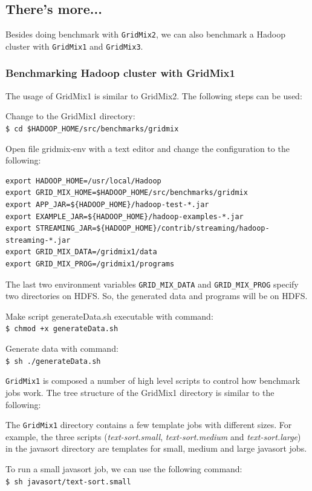 \subsection*{There's more...}
Besides doing benchmark with \verb|GridMix2|, we can also benchmark a Hadoop cluster with \verb|GridMix1| and \verb|GridMix3|.

\subsubsection*{Benchmarking Hadoop cluster with GridMix1}
The usage of GridMix1 is similar to GridMix2. The following steps can be used:

Change to the GridMix1 directory: \\
\verb|$ cd $HADOOP_HOME/src/benchmarks/gridmix|

Open file gridmix-env with a text editor and change the configuration to the following:
\lstset{style=bashstyle}
\begin{lstlisting}
export HADOOP_HOME=/usr/local/Hadoop
export GRID_MIX_HOME=$HADOOP_HOME/src/benchmarks/gridmix
export APP_JAR=${HADOOP_HOME}/hadoop-test-*.jar
export EXAMPLE_JAR=${HADOOP_HOME}/hadoop-examples-*.jar
export STREAMING_JAR=${HADOOP_HOME}/contrib/streaming/hadoop-streaming-*.jar
export GRID_MIX_DATA=/gridmix1/data
export GRID_MIX_PROG=/gridmix1/programs
\end{lstlisting}

The last two environment variables \verb|GRID_MIX_DATA| and \verb|GRID_MIX_PROG| specify two directories on HDFS. So, the generated data and programs will be on HDFS.

Make script generateData.sh executable with command: \\
\verb|$ chmod +x generateData.sh|

Generate data with command: \\
\verb|$ sh ./generateData.sh|

\verb|GridMix1| is composed a number of high level scripts to control how benchmark jobs work. The tree structure of the GridMix1 directory is similar to the following:

The \verb|GridMix1| directory contains a few template jobs with different sizes. For example, the three scripts (\emph{text-sort.small}, \emph{text-sort.medium} and \emph{text-sort.large}) in the javasort directory are templates for small, medium and large javasort jobs.

To run a small javasort job, we can use the following command:\\
\verb|$ sh javasort/text-sort.small|

